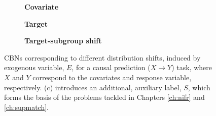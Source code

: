 \begin{figure}[]
        \centering
        \begin{subfigure}[t]{0.3\textwidth}
            \centering
            \caption{\textbf{Covariate}}
        \end{subfigure}
        \begin{subfigure}[t]{0.3\textwidth}
            \centering
            \caption{\textbf{Target}}
        \end{subfigure}
        \begin{subfigure}[t]{0.3\textwidth}
            \centering
            \caption{\textbf{Target-subgroup shift}}
        \end{subfigure}
    \caption{
        \acp{CBN} corresponding to different distribution shifts, induced by
        exogenous variable, \(E\), for a causal prediction (\(X \to Y \)) task, where \(X\) and
        \(Y\) correspond to the covariates and response variable, respectively.
        (c) introduces an additional, auxiliary label, \(S\), which forms the basis of the problems
        tackled in Chapters \ref{ch:nifr} and \ref{ch:supmatch}.
    }
    \label{fig:ds_cbns}
\end{figure}
